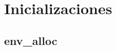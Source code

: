 \documentclass[titlepage,a4paper,12pt]{article}
\title{ }
\date{}
\begin{document}
\maketitle

\tableofcontents %



\newpage
\newpage

\section{Inicializaciones}

\subsection{env\_alloc}
\end{document}
